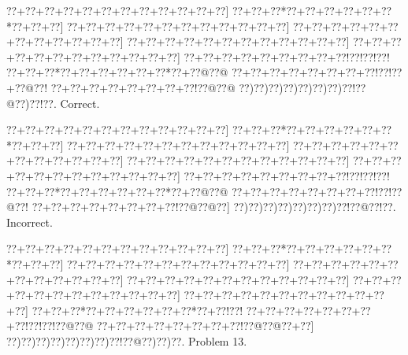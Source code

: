 \documentclass[a5paper]{article}
\begin{document}
\begin{center}
{\goo
\0??+\0??+\0??+\0??+\0??+\0??+\0??+\0??+\0??+\0??+\0??+\0??]
\0??+\0??+\0??*\0??+\0??+\0??+\0??+\0??+\0??*\0??+\0??+\0??]
\0??+\0??+\0??+\0??+\0??+\0??+\0??+\0??+\0??+\0??+\0??+\0??]
\0??+\0??+\0??+\0??+\0??+\0??+\0??+\0??+\0??+\0??+\0??+\0??]
\0??+\0??+\0??+\0??+\0??+\0??+\0??+\0??+\0??+\0??+\0??+\0??]
\0??+\0??+\0??+\0??+\0??+\0??+\0??+\0??+\0??+\0??+\0??+\0??]
\0??+\0??+\0??+\0??+\0??+\0??+\0??+\0??+\0??!\0??!\0??!\0??!
\0??+\0??+\0??*\0??+\0??+\0??+\0??+\0??+\0??*\0??+\0??@\0??@
\0??+\0??+\0??+\0??+\0??+\0??+\0??+\0??!\0??!\0??+\0??@\0??!
\0??+\0??+\0??+\0??+\0??+\0??+\0??+\0??!\0??@\0??@
\0??)\0??)\0??)\0??)\0??)\0??)\0??)\0??!\0??@\0??)\0??!\0??.
}
Correct. 

\end{center}
\begin{center}
{\goo
\0??+\0??+\0??+\0??+\0??+\0??+\0??+\0??+\0??+\0??+\0??+\0??]
\0??+\0??+\0??*\0??+\0??+\0??+\0??+\0??+\0??*\0??+\0??+\0??]
\0??+\0??+\0??+\0??+\0??+\0??+\0??+\0??+\0??+\0??+\0??+\0??]
\0??+\0??+\0??+\0??+\0??+\0??+\0??+\0??+\0??+\0??+\0??+\0??]
\0??+\0??+\0??+\0??+\0??+\0??+\0??+\0??+\0??+\0??+\0??+\0??]
\0??+\0??+\0??+\0??+\0??+\0??+\0??+\0??+\0??+\0??+\0??+\0??]
\0??+\0??+\0??+\0??+\0??+\0??+\0??+\0??+\0??!\0??!\0??!\0??!
\0??+\0??+\0??*\0??+\0??+\0??+\0??+\0??+\0??*\0??+\0??@\0??@
\0??+\0??+\0??+\0??+\0??+\0??+\0??+\0??!\0??!\0??@\0??!
\0??+\0??+\0??+\0??+\0??+\0??+\0??+\0??!\0??@\0??@\0??]
\0??)\0??)\0??)\0??)\0??)\0??)\0??)\0??!\0??@\0??!\0??.
}
Incorrect. 

\end{center}
\newpage
\begin{center}
{\goo
\0??+\0??+\0??+\0??+\0??+\0??+\0??+\0??+\0??+\0??+\0??+\0??]
\0??+\0??+\0??*\0??+\0??+\0??+\0??+\0??+\0??*\0??+\0??+\0??]
\0??+\0??+\0??+\0??+\0??+\0??+\0??+\0??+\0??+\0??+\0??+\0??]
\0??+\0??+\0??+\0??+\0??+\0??+\0??+\0??+\0??+\0??+\0??+\0??]
\0??+\0??+\0??+\0??+\0??+\0??+\0??+\0??+\0??+\0??+\0??+\0??]
\0??+\0??+\0??+\0??+\0??+\0??+\0??+\0??+\0??+\0??+\0??+\0??]
\0??+\0??+\0??+\0??+\0??+\0??+\0??+\0??+\0??+\0??+\0??+\0??]
\0??+\0??+\0??*\0??+\0??+\0??+\0??+\0??+\0??*\0??+\0??!\0??!
\0??+\0??+\0??+\0??+\0??+\0??+\0??+\0??!\0??!\0??!\0??@\0??@
\0??+\0??+\0??+\0??+\0??+\0??+\0??+\0??!\0??@\0??@\0??+\0??]
\0??)\0??)\0??)\0??)\0??)\0??)\0??)\0??!\0??@\0??)\0??)\0??.
}
Problem 13.

\end{center}
\end{document}
